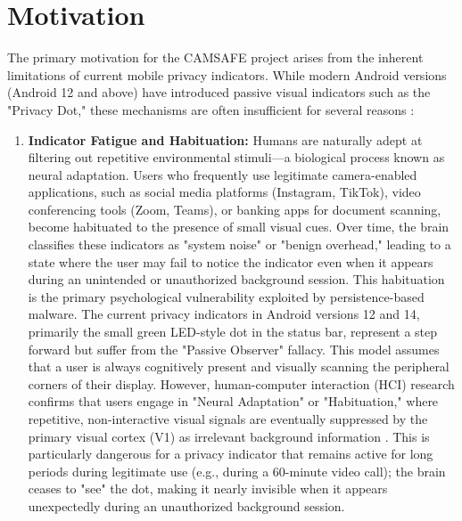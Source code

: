 \documentclass[12pt,a4paper]{report}
\begin{document}
    \section{Motivation}
    The primary motivation for the CAMSAFE project arises from the inherent limitations of current mobile privacy indicators. While modern Android versions (Android 12 and above) have introduced passive visual indicators such as the "Privacy Dot," these mechanisms are often insufficient for several reasons \cite{privacydot}:
    \begin{enumerate}
        \item \textbf{Indicator Fatigue and Habituation:} Humans are naturally adept at filtering out repetitive environmental stimuli—a biological process known as neural adaptation. Users who frequently use legitimate camera-enabled applications, such as social media platforms (Instagram, TikTok), video conferencing tools (Zoom, Teams), or banking apps for document scanning, become habituated to the presence of small visual cues. Over time, the brain classifies these indicators as "system noise" or "benign overhead," leading to a state where the user may fail to notice the indicator even when it appears during an unintended or unauthorized background session. This habituation is the primary psychological vulnerability exploited by persistence-based malware.
        The current privacy indicators in Android versions 12 and 14, primarily the small green LED-style dot in the status bar, represent a step forward but suffer from the "Passive Observer" fallacy. This model assumes that a user is always cognitively present and visually scanning the peripheral corners of their display. However, human-computer interaction (HCI) research confirms that users engage in "Neural Adaptation" or "Habituation," where repetitive, non-interactive visual signals are eventually suppressed by the primary visual cortex (V1) as irrelevant background information \cite{privacydot}. This is particularly dangerous for a privacy indicator that remains active for long periods during legitimate use (e.g., during a 60-minute video call); the brain ceases to "see" the dot, making it nearly invisible when it appears unexpectedly during an unauthorized background session.


\end{enumerate}
\end{document}
